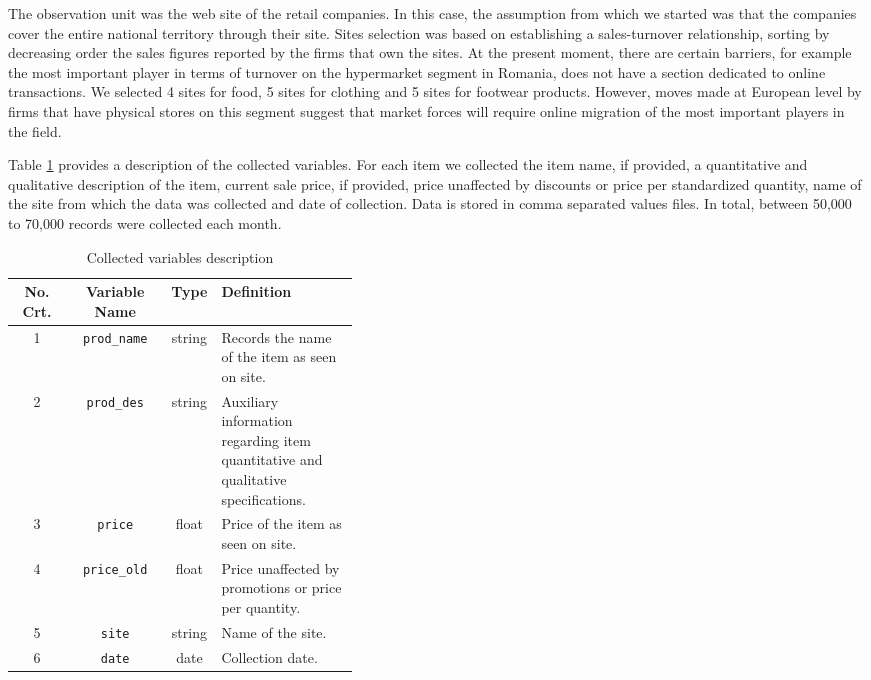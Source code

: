 \documentclass[]{article}
\begin{document}
The observation unit was the web site of the retail companies. In this case, the assumption from which we started was 
that the companies cover the entire national territory through their site. Sites selection was based on establishing a 
sales-turnover relationship, sorting by decreasing order the sales figures reported by the firms that own the sites. 
At the present moment, there are certain barriers, for example the most important player in terms of turnover on the 
hypermarket segment in Romania, does not have a section dedicated to online transactions. We selected 4 sites for food, 
5 sites for clothing and 5 sites for footwear products. However, moves made at European level by firms that have physical 
stores on this segment suggest that market forces will require online migration of the most important players in the field.

Table \ref{table:2} provides a description of the collected variables. For each item we collected the item name, if provided, 
a quantitative and qualitative description of the item, current sale price, if provided, price unaffected by discounts or 
price per standardized quantity, name of the site from which the data was collected and date of collection. Data is stored 
in comma separated values files. In total, between 50,000 to 70,000 records were collected each month.

\begin{table}[h!]
	\centering
	\begin{tabular}{ c c c p{0.4\linewidth}}
		\hline
		 No. Crt. & Variable Name & Type & Definition  \\
		\hline  
		1 & \texttt{prod\_name} & string & Records the name of the item as seen on site.\\  \hline
		2 & \texttt{prod\_des}  & string & Auxiliary information regarding item quantitative and qualitative specifications. \\ \hline
		3 & \texttt{price}	  	& float  & Price of the item as seen on site.  \\ \hline
		4 & \texttt{price\_old} & float  & Price unaffected by promotions or price per quantity.\\ \hline
		5 & \texttt{site}	  	& string & Name of the site. \\ \hline
		6 & \texttt{date} 	  	& date   & Collection date. \\ 
		\hline
	\end{tabular}
	\caption{Collected variables description}
	\label{table:2}
\end{table}
\end{document}
